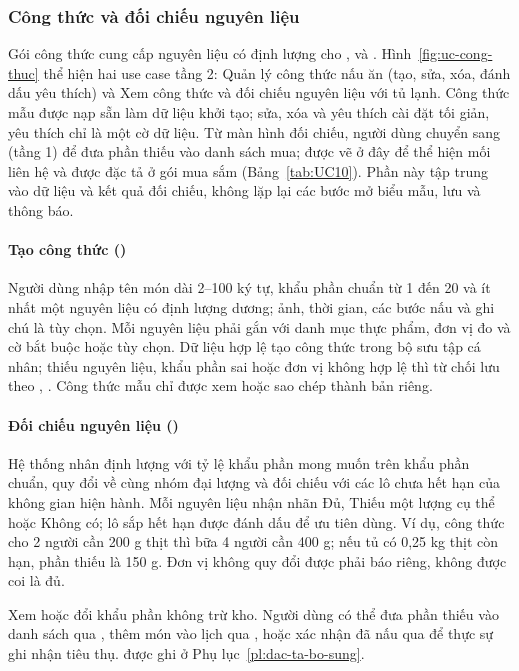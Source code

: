 \subsubsection{Công thức và đối chiếu nguyên liệu}\label{sssec:pr-cong-thuc}

Gói công thức cung cấp nguyên liệu có định lượng cho ,  và . Hình~\ref{fig:uc-cong-thuc} thể hiện hai use case tầng 2:  Quản lý công thức nấu ăn (tạo, sửa, xóa, đánh dấu yêu thích) và  Xem công thức và đối chiếu nguyên liệu với tủ lạnh. Công thức mẫu được nạp sẵn làm dữ liệu khởi tạo; sửa, xóa và yêu thích cài đặt tối giản, yêu thích chỉ là một cờ dữ liệu. Từ màn hình đối chiếu, người dùng chuyển sang  (tầng 1) để đưa phần thiếu vào danh sách mua;  được vẽ ở đây để thể hiện mối liên hệ và được đặc tả ở gói mua sắm (Bảng~\ref{tab:UC10}). Phần này tập trung vào dữ liệu và kết quả đối chiếu, không lặp lại các bước mở biểu mẫu, lưu và thông báo.



\paragraph*{Tạo công thức ()}
Người dùng nhập tên món dài 2--100 ký tự, khẩu phần chuẩn từ 1 đến 20 và ít nhất một nguyên liệu có định lượng dương; ảnh, thời gian, các bước nấu và ghi chú là tùy chọn. Mỗi nguyên liệu phải gắn với danh mục thực phẩm, đơn vị đo và cờ bắt buộc hoặc tùy chọn. Dữ liệu hợp lệ tạo công thức trong bộ sưu tập cá nhân; thiếu nguyên liệu, khẩu phần sai hoặc đơn vị không hợp lệ thì từ chối lưu theo , . Công thức mẫu chỉ được xem hoặc sao chép thành bản riêng.


\paragraph*{Đối chiếu nguyên liệu ()}
Hệ thống nhân định lượng với tỷ lệ khẩu phần mong muốn trên khẩu phần chuẩn, quy đổi về cùng nhóm đại lượng và đối chiếu với các lô chưa hết hạn của không gian hiện hành. Mỗi nguyên liệu nhận nhãn Đủ, Thiếu một lượng cụ thể hoặc Không có; lô sắp hết hạn được đánh dấu để ưu tiên dùng. Ví dụ, công thức cho 2 người cần 200 g thịt thì bữa 4 người cần 400 g; nếu tủ có 0,25 kg thịt còn hạn, phần thiếu là 150 g. Đơn vị không quy đổi được phải báo riêng, không được coi là đủ.

Xem hoặc đổi khẩu phần không trừ kho. Người dùng có thể đưa phần thiếu vào danh sách qua , thêm món vào lịch qua , hoặc xác nhận đã nấu qua  để thực sự ghi nhận tiêu thụ.  được ghi ở Phụ lục~\ref{pl:dac-ta-bo-sung}.
